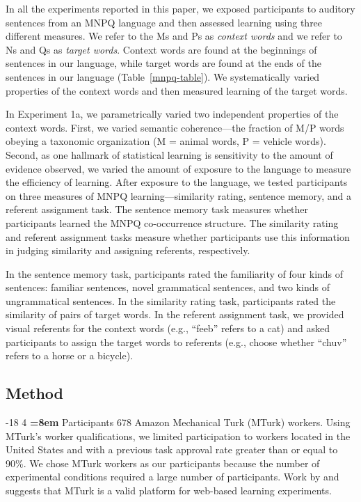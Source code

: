 \documentclass[man,longtable, floatmark]{my-apa6}
\makeatletter
\renewcommand\subsubsection{\@startsection{subsubsection}{3}{\z@}%
                       {-18\p@ \@plus -4\p@ \@minus -4\p@}%
                       {4\p@ \@plus 2\p@ \@minus 2\p@}%
                       {\normalfont\normalsize\bfseries\boldmath
                        \rightskip=\z@ \@plus 8em\pretolerance=10000 }}
\makeatother
\begin{document}
In all the experiments reported in this paper, we exposed participants to auditory sentences from an MNPQ language and then assessed learning using three different measures. We refer to the Ms and Ps as \emph{context words} and we refer to Ns and Qs as \emph{target words}. Context words are found at the beginnings of sentences in our language, while target words are found at the ends of the sentences in our language (Table~\ref{mnpq-table}). We systematically varied properties of the context words and then measured learning of the target words.

In Experiment 1a, we parametrically varied two independent properties of the context words. First, we varied semantic coherence---the fraction of M/P words obeying a taxonomic organization (M = animal words, P = vehicle words). Second, as one hallmark of statistical learning is sensitivity to the amount of evidence observed, we varied the amount of exposure to the language to measure the efficiency of learning. After exposure to the language, we tested participants on three measures of MNPQ learning---similarity rating, sentence memory, and a referent assignment task. The sentence memory task measures whether participants learned the MNPQ co-occurrence structure. The similarity rating and referent assignment tasks measure whether participants use this information in judging similarity and assigning referents, respectively.

In the sentence memory task, participants rated the familiarity of four kinds of sentences: familiar sentences, novel grammatical sentences, and two kinds of ungrammatical sentences. In the similarity rating task, participants rated the similarity of pairs of target words. In the referent assignment task, we provided visual referents for the context words (e.g., ``feeb'' refers to a cat) and asked participants to assign the target words to referents (e.g., choose whether ``chuv'' refers to a horse or a bicycle).

\subsection{Method}

\subsubsection{Participants}
678 Amazon Mechanical Turk (MTurk) workers. Using MTurk's worker qualifications, we limited participation to workers located in the United States and with a previous task approval rate greater than or equal to 90\%. We chose MTurk workers as our participants because the number of experimental conditions required a large number of participants. Work by \citet{buhrmester2010} and \citet{crump2013} suggests that MTurk is a valid platform for web-based learning experiments.
\end{document}
